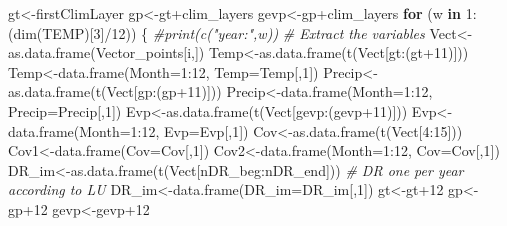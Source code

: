 \documentclass[
  10pt,
  b5paper,
]{book}
\newenvironment{Shaded}{\begin{snugshade}}{\end{snugshade}}
\newcommand{\AttributeTok}[1]{\textcolor[rgb]{0.77,0.63,0.00}{#1}}
\newcommand{\CommentTok}[1]{\textcolor[rgb]{0.56,0.35,0.01}{\textit{#1}}}
\newcommand{\ControlFlowTok}[1]{\textcolor[rgb]{0.13,0.29,0.53}{\textbf{#1}}}
\newcommand{\DecValTok}[1]{\textcolor[rgb]{0.00,0.00,0.81}{#1}}
\newcommand{\FunctionTok}[1]{\textcolor[rgb]{0.00,0.00,0.00}{#1}}
\newcommand{\NormalTok}[1]{#1}
\newcommand{\OtherTok}[1]{\textcolor[rgb]{0.56,0.35,0.01}{#1}}
\newcommand{\SpecialCharTok}[1]{\textcolor[rgb]{0.00,0.00,0.00}{#1}}
\begin{document}
\begin{Shaded}
\begin{Highlighting}[]
\NormalTok{gt}\OtherTok{\textless{}{-}}\NormalTok{firstClimLayer}
\NormalTok{gp}\OtherTok{\textless{}{-}}\NormalTok{gt}\SpecialCharTok{+}\NormalTok{clim\_layers}
\NormalTok{gevp}\OtherTok{\textless{}{-}}\NormalTok{gp}\SpecialCharTok{+}\NormalTok{clim\_layers}
\ControlFlowTok{for}\NormalTok{ (w }\ControlFlowTok{in} \DecValTok{1}\SpecialCharTok{:}\NormalTok{(}\FunctionTok{dim}\NormalTok{(TEMP)[}\DecValTok{3}\NormalTok{]}\SpecialCharTok{/}\DecValTok{12}\NormalTok{)) \{}
\CommentTok{\#print(c("year:",w))}
\CommentTok{\# Extract the variables }
\NormalTok{Vect}\OtherTok{\textless{}{-}}\FunctionTok{as.data.frame}\NormalTok{(Vector\_points[i,])}
\NormalTok{Temp}\OtherTok{\textless{}{-}}\FunctionTok{as.data.frame}\NormalTok{(}\FunctionTok{t}\NormalTok{(Vect[gt}\SpecialCharTok{:}\NormalTok{(gt}\SpecialCharTok{+}\DecValTok{11}\NormalTok{)]))}
\NormalTok{Temp}\OtherTok{\textless{}{-}}\FunctionTok{data.frame}\NormalTok{(}\AttributeTok{Month=}\DecValTok{1}\SpecialCharTok{:}\DecValTok{12}\NormalTok{, }\AttributeTok{Temp=}\NormalTok{Temp[,}\DecValTok{1}\NormalTok{])}
\NormalTok{Precip}\OtherTok{\textless{}{-}}\FunctionTok{as.data.frame}\NormalTok{(}\FunctionTok{t}\NormalTok{(Vect[gp}\SpecialCharTok{:}\NormalTok{(gp}\SpecialCharTok{+}\DecValTok{11}\NormalTok{)]))}
\NormalTok{Precip}\OtherTok{\textless{}{-}}\FunctionTok{data.frame}\NormalTok{(}\AttributeTok{Month=}\DecValTok{1}\SpecialCharTok{:}\DecValTok{12}\NormalTok{, }\AttributeTok{Precip=}\NormalTok{Precip[,}\DecValTok{1}\NormalTok{])}
\NormalTok{Evp}\OtherTok{\textless{}{-}}\FunctionTok{as.data.frame}\NormalTok{(}\FunctionTok{t}\NormalTok{(Vect[gevp}\SpecialCharTok{:}\NormalTok{(gevp}\SpecialCharTok{+}\DecValTok{11}\NormalTok{)]))}
\NormalTok{Evp}\OtherTok{\textless{}{-}}\FunctionTok{data.frame}\NormalTok{(}\AttributeTok{Month=}\DecValTok{1}\SpecialCharTok{:}\DecValTok{12}\NormalTok{, }\AttributeTok{Evp=}\NormalTok{Evp[,}\DecValTok{1}\NormalTok{])}
\NormalTok{Cov}\OtherTok{\textless{}{-}}\FunctionTok{as.data.frame}\NormalTok{(}\FunctionTok{t}\NormalTok{(Vect[}\DecValTok{4}\SpecialCharTok{:}\DecValTok{15}\NormalTok{]))}
\NormalTok{Cov1}\OtherTok{\textless{}{-}}\FunctionTok{data.frame}\NormalTok{(}\AttributeTok{Cov=}\NormalTok{Cov[,}\DecValTok{1}\NormalTok{])}
\NormalTok{Cov2}\OtherTok{\textless{}{-}}\FunctionTok{data.frame}\NormalTok{(}\AttributeTok{Month=}\DecValTok{1}\SpecialCharTok{:}\DecValTok{12}\NormalTok{, }\AttributeTok{Cov=}\NormalTok{Cov[,}\DecValTok{1}\NormalTok{])}
\NormalTok{DR\_im}\OtherTok{\textless{}{-}}\FunctionTok{as.data.frame}\NormalTok{(}\FunctionTok{t}\NormalTok{(Vect[nDR\_beg}\SpecialCharTok{:}\NormalTok{nDR\_end])) }\CommentTok{\# DR one per year according to LU}
\NormalTok{DR\_im}\OtherTok{\textless{}{-}}\FunctionTok{data.frame}\NormalTok{(}\AttributeTok{DR\_im=}\NormalTok{DR\_im[,}\DecValTok{1}\NormalTok{])}
\NormalTok{gt}\OtherTok{\textless{}{-}}\NormalTok{gt}\SpecialCharTok{+}\DecValTok{12}
\NormalTok{gp}\OtherTok{\textless{}{-}}\NormalTok{gp}\SpecialCharTok{+}\DecValTok{12}
\NormalTok{gevp}\OtherTok{\textless{}{-}}\NormalTok{gevp}\SpecialCharTok{+}\DecValTok{12}
\end{Highlighting}
\end{Shaded}
\end{document}
